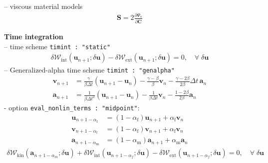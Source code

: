 \documentclass[a4paper,12pt]{report}
\begin{document}
-- viscous material models
\begin{equation}
\begin{aligned}
\boldsymbol{S} = 2\frac{\partial\mathit{\Psi}_{\mathrm{v}}}{\partial \dot{\boldsymbol{C}}}
\end{aligned}
\end{equation}

\textbf{Time integration}\\

-- time scheme \verb.timint : "static".\\
\begin{equation}
\begin{aligned}
\delta \mathcal{W}_{\mathrm{int}}(\boldsymbol{u}_{n+1};\delta\boldsymbol{u}) - \delta \mathcal{W}_{\mathrm{ext}}(\boldsymbol{u}_{n+1};\delta\boldsymbol{u}) = 0, \quad \forall \; \delta\boldsymbol{u}\end{aligned}
\end{equation}
-- Generalized-alpha time scheme \verb.timint : "genalpha".
\begin{equation}
\begin{aligned}
\boldsymbol{v}_{n+1} &= \frac{\gamma}{\beta\Delta t}(\boldsymbol{u}_{n+1}-\boldsymbol{u}_{n}) - \frac{\gamma-\beta}{\beta} \boldsymbol{v}_{n} - \frac{\gamma-2\beta}{2\beta}\Delta t\,\boldsymbol{a}_{n} \\
\boldsymbol{a}_{n+1} &= \frac{1}{\beta\Delta t^2}(\boldsymbol{u}_{n+1}-\boldsymbol{u}_{n}) - \frac{1}{\beta\Delta t} \boldsymbol{v}_{n} - \frac{1-2\beta}{2\beta}\boldsymbol{a}_{n}
\end{aligned}
\end{equation}
\quad - option \verb.eval_nonlin_terms : "midpoint".:
\begin{equation}
\label{equation-solid-midpoint-genalpha}
\begin{aligned}
\boldsymbol{u}_{n+1-\alpha_{\mathrm{f}}} &= (1-\alpha_{\mathrm{f}})\boldsymbol{u}_{n+1} + \alpha_{\mathrm{f}} \boldsymbol{v}_{n} \\
\boldsymbol{v}_{n+1-\alpha_{\mathrm{f}}} &= (1-\alpha_{\mathrm{f}})\boldsymbol{v}_{n+1} + \alpha_{\mathrm{f}} \boldsymbol{v}_{n} \\
\boldsymbol{a}_{n+1-\alpha_{\mathrm{m}}} &= (1-\alpha_{\mathrm{m}})\boldsymbol{a}_{n+1} + \alpha_{\mathrm{m}} \boldsymbol{a}_{n}
\end{aligned}
\end{equation}
\begin{equation}
\begin{aligned}
\delta \mathcal{W}_{\mathrm{kin}}(\boldsymbol{a}_{n+1-\alpha_{m}};\delta\boldsymbol{u}) + \delta \mathcal{W}_{\mathrm{int}}(\boldsymbol{u}_{n+1-\alpha_{f}};\delta\boldsymbol{u}) - \delta \mathcal{W}_{\mathrm{ext}}(\boldsymbol{u}_{n+1-\alpha_{f}};\delta\boldsymbol{u}) = 0, \quad \forall \; \delta\boldsymbol{u}\end{aligned}
\end{equation}
\end{document}
